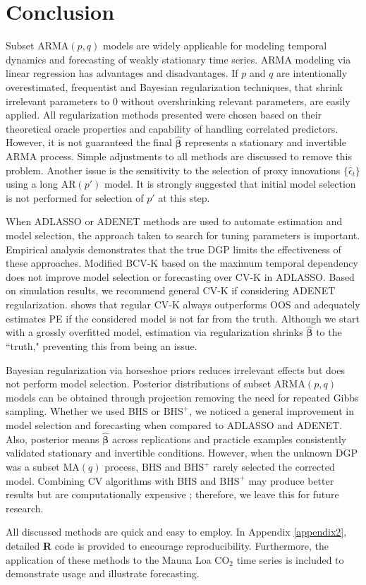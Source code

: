 \section{Conclusion}

Subset ARMA$(p,q)$ models are widely applicable for modeling temporal dynamics and forecasting of weakly stationary time series. ARMA modeling via linear regression has advantages and disadvantages. If $p$ and $q$ are intentionally overestimated, frequentist and Bayesian regularization techniques, that shrink irrelevant parameters to $0$ without overshrinking relevant parameters, are easily applied. All regularization methods presented were chosen based on their theoretical oracle properties and capability of handling correlated predictors. However, it is not guaranteed the final $\hat{\bm{\beta}}$ represents a stationary and invertible ARMA process. Simple adjustments to all methods are discussed to remove this problem. Another issue is the sensitivity to the selection of proxy innovations $\{\hat{\epsilon}_t\}$ using a long AR$(p')$ model. It is strongly suggested that initial model selection is not performed for selection of $p'$ at this step.

When ADLASSO or ADENET methods are used to automate estimation and model selection, the approach taken to search for tuning parameters is important. Empirical analysis demonstrates that the true DGP limits the effectiveness of these approaches. Modified BCV-K based on the maximum temporal dependency does not improve model selection or forecasting over CV-K in ADLASSO. Based on simulation results, we recommend general CV-K if considering ADENET regularization. \cite{Bergmeir2018} shows that regular CV-K always outperforms OOS and adequately estimates PE if the considered model is not far from the truth. Although we start with a grossly overfitted model, estimation via regularization shrinks $\hat{\bm{\beta}}$ to the ``truth," preventing this from being an issue. 

Bayesian regularization via horseshoe priors reduces irrelevant effects but does not perform model selection.  Posterior distributions of subset ARMA$(p,q)$ models can be obtained through projection removing the need for repeated Gibbs sampling. Whether we used BHS or $\textrm{BHS}^+$, we noticed a general improvement in model selection and forecasting when compared to ADLASSO and ADENET. Also, posterior means $\hat{\bm{\beta}}$ across replications and practicle examples consistently validated stationary and invertible conditions.  However, when the unknown DGP was a subset MA$(q)$ process, BHS and $\textrm{BHS}^+$ rarely selected the corrected model. Combining CV algorithms with BHS and $\textrm{BHS}^+$ may produce better results but are computationally expensive \citep{Peltola2014}; therefore, we leave this for future research.

All discussed methods are quick and easy to employ. In Appendix \ref{appendix2}, detailed {\bf R} code is provided to encourage reproducibility. Furthermore, the application of these methods to the Mauna Loa $\textrm{CO}_2$ time series is included to demonstrate usage and illustrate forecasting. 

